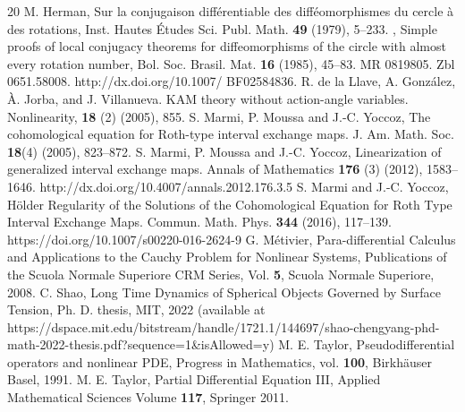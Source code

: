 \documentclass[11pt]{amsart}
\begin{document}
\begin{thebibliography}{20}
  M. Herman, Sur la conjugaison diff\'erentiable des diff\'eomorphismes du cercle \`a des rotations, Inst. Hautes \'Etudes Sci. Publ. Math. \textbf{49} (1979), 5--233.
 \bysame, Simple proofs of local conjugacy theorems for diffeomorphisms of the circle with almost every rotation number, Bol. Soc. Brasil. Mat. \textbf{16} (1985), 
45--83. MR 0819805. Zbl 0651.58008. http://dx.doi.org/10.1007/ BF02584836.
 R. de la Llave, A. Gonz\'alez, \`A. Jorba, and J. Villanueva. KAM theory without action-angle variables. Nonlinearity, \textbf{18} (2) (2005), 855.
 S. Marmi, P. Moussa and J.-C. Yoccoz,  The cohomological equation for Roth-type interval exchange maps. J. Am. Math. Soc. \textbf{18}(4) (2005), 823--872.
 S. Marmi, P. Moussa and J.-C. Yoccoz, Linearization of generalized interval exchange maps. Annals of Mathematics \textbf{176} (3) (2012), 1583--1646.
http://dx.doi.org/10.4007/annals.2012.176.3.5
 S. Marmi and J.-C. Yoccoz,  H\"older Regularity of the Solutions of the Cohomological Equation for Roth Type Interval Exchange Maps. Commun. Math. Phys. 
\textbf{344} (2016), 117--139.  https://doi.org/10.1007/s00220-016-2624-9
 G. M\'etivier, Para-differential Calculus and Applications to the Cauchy Problem for Nonlinear Systems, Publications of the Scuola Normale Superiore
CRM Series, Vol. \textbf{5}, Scuola Normale Superiore, 2008.
  C. Shao, Long Time Dynamics of Spherical Objects Governed by Surface Tension, Ph. D. thesis, MIT, 2022 (available at https://dspace.mit.edu/bitstream/handle/1721.1/144697/shao-chengyang-phd-math-2022-thesis.pdf?sequence=1\&isAllowed=y)
 M. E. Taylor, Pseudodifferential operators and nonlinear PDE, Progress in Mathematics, vol. \textbf{100}, Birkh\"auser Basel, 1991.
 M. E. Taylor, Partial Differential Equation III,  Applied Mathematical Sciences Volume \textbf{117}, Springer 2011.
\end{thebibliography}
\end{document}
